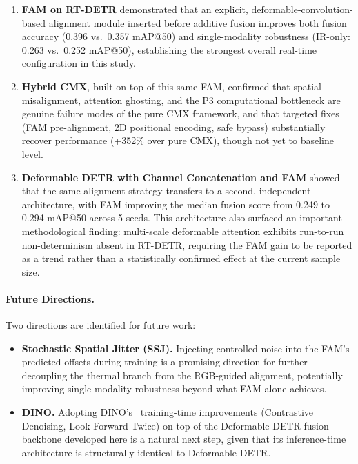 \documentclass[12pt, a4paper]{article}
\begin{document}
\begin{enumerate}
    \item \textbf{FAM on RT-DETR} demonstrated that an explicit, deformable-convolution-based alignment module inserted before additive fusion improves both fusion accuracy (0.396 vs.\ 0.357 mAP@50) and single-modality robustness (IR-only: 0.263 vs.\ 0.252 mAP@50), establishing the strongest overall real-time configuration in this study.
    \item \textbf{Hybrid CMX}, built on top of this same FAM, confirmed that spatial misalignment, attention ghosting, and the P3 computational bottleneck are genuine failure modes of the pure CMX framework, and that targeted fixes (FAM pre-alignment, 2D positional encoding, safe bypass) substantially recover performance (+352\% over pure CMX), though not yet to baseline level.
    \item \textbf{Deformable DETR with Channel Concatenation and FAM} showed that the same alignment strategy transfers to a second, independent architecture, with FAM improving the median fusion score from 0.249 to 0.294 mAP@50 across 5 seeds. This architecture also surfaced an important methodological finding: multi-scale deformable attention exhibits run-to-run non-determinism absent in RT-DETR, requiring the FAM gain to be reported as a trend rather than a statistically confirmed effect at the current sample size.
\end{enumerate}

\paragraph{Future Directions.}
Two directions are identified for future work:

\begin{itemize}
    \item \textbf{Stochastic Spatial Jitter (SSJ).} Injecting controlled noise into the FAM's predicted offsets during training is a promising direction for further decoupling the thermal branch from the RGB-guided alignment, potentially improving single-modality robustness beyond what FAM alone achieves.
    \item \textbf{DINO.} Adopting DINO's~\cite{zhang2022dino} training-time improvements (Contrastive Denoising, Look-Forward-Twice) on top of the Deformable DETR fusion backbone developed here is a natural next step, given that its inference-time architecture is structurally identical to Deformable DETR.
\end{itemize}
\end{document}

